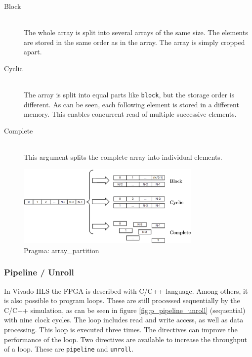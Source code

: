 \begin{description}
\item[Block]\hfill \\
The whole array is split into several arrays of the same size. The elements are stored in the same order as in the array. The array is simply cropped apart.
\item[Cyclic]\hfill \\ 
The array is split into equal parts like \texttt{block}, but the storage order
is different. As can be seen, each following element is stored in a different
memory. This enables concurrent read of multiple successive elements.
\item[Complete]\hfill \\ 
This argument splits the complete array into individual elements.
\end{description}


\begin{figure}[tb!]
    \centering
    \includegraphics[width=0.8\textwidth]{images/theory/array_partition.png}
    \caption{Pragma: array\_partition}
    \label{fig:p_array_partition}
\end{figure}

\subsubsection*{Pipeline / Unroll}
In Vivado HLS the FPGA is described with C/C++ language. Among others, it is also possible to program  loops. These are still processed sequentially by the C/C++ simulation, as can be seen in figure \ref{fig:p_pipeline_unroll} (sequential) with nine clock cycles. The loop includes read and write access, as well as data processing. This loop is executed three times.  The directives can improve the performance of the loop. Two directives are available to increase the throughput of a loop. These are \texttt{pipeline} and \texttt{unroll}.

